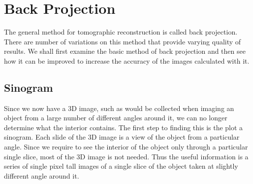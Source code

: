 \section{Back Projection} %
\label{sec:back_projection}
    The general method for tomographic reconstruction is called back projection. There are number of variations on this method that provide varying quality of results. We shall first examine the basic method of back projection and then see how it can be improved to increase the accuracy of the images calculated with it.

    \subsection{Sinogram} %
    \label{sub:sinogram}
        Since we now have a 3D image, such as would be collected when imaging an object from a large number of different angles around it, we can no longer determine what the interior contains. The first step to finding this is the plot a sinogram. Each slide of the 3D image is a view of the object from a particular angle. Since we require to see the interior of the object only through a particular single slice, most of the 3D image is not needed. Thus the useful information is a series of single pixel tall images of a single slice of the object taken at slightly different angle around it.

